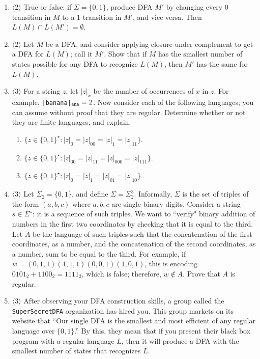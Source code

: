 \documentclass[]{article}
\newcommand{\Level}[1]{{\color{blue} $\langle$#1$\rangle$}}
\begin{document}
\begin{enumerate}
\item \Level{2} True or false: if $\Sigma=\{0,1\}$, produce DFA $M'$ by changing every 0 transition in $M$ to a 1 transition in $M'$, and vice versa. Then $L(M) \cap L(M') = \emptyset$.

\item \Level{2} Let $M$ be a DFA, and consider applying closure under complement to get a DFA for $\overline{L(M)}$; call it $M'$. 
Show that if $M$ has the smallest number of states possible for any DFA to recognize $L(M)$, then $M'$ has the same for $\overline{L(M)}$.

\item \Level{3} For a string $z$, let $|z|_x$ be the number of occurrences of $x$ in $z$.
For example, {\tt |banana|}$_{\tt ana} = 2$. 
Now consider each of the following languages; you can assume without proof that they are regular.
Determine whether or not they are finite languages, and explain.
\begin{enumerate}
	\item $\{z \in \{0,1\}^\star : |z|_0 = |z|_{00} = |z|_{1} = |z|_{11}\}$.
	\item $\{z \in \{0,1\}^\star : |z|_{00} = |z|_{11} = |z|_{000} = |z|_{111}\}$.
	\item $\{z \in \{0,1\}^\star : |z|_0 = |z|_{1} = |z|_{01} = |z|_{10}\}$.
\end{enumerate}

\item \Level{3} Let $\Sigma_{2} = \{0, 1\}$, and define $\Sigma = \Sigma_{2}^3$. Informally, $\Sigma$ is the set of triples of the form $(a, b, c)$ where $a, b, c$ are single binary digits. Consider a string $s \in \Sigma^\star$: it is a sequence of such triples. We want to ``verify" binary addition of numbers in the first two coordinates by checking that it is equal to the third. Let $A$ be the language of such triples such that the concatenation of the first coordinates, as a number, and the concatenation of the second coordinates, as a number, sum to be equal to the third. For example, if $w = (0, 1, 1)(1,1,1)(0,0,1)(1,0,1)$, this is encoding $0101_2 + 1100_2 = 1111_2$, which is false; therefore, $w \notin A$. Prove that $A$ is regular.

\item \Level{3} After observing your DFA construction skills, a group called the {\tt SuperSecretDFA} organization has hired you. This group markets on its website that ``Our single DFA is the smallest and most efficient of any regular language over $\{0,1\}$.''
By this, they mean that if you present their black box program with a regular language $L$, then it will produce a DFA with the smallest number of states that recognizes $L$.


\end{enumerate}
\end{document}
